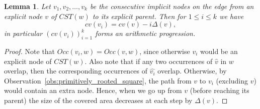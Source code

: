 \documentclass{article}
\theoremstyle{theorem}
\newtheorem{lemma}{Lemma}
\theoremstyle{definition}
\newcommand{\CST}{\mathit{CST}}
\newcommand{\Occ}{\mathit{Occ}}
\renewcommand{\c}{\mathit{cv}}
\begin{document}
  \begin{lemma}\label{lem:formula}
    Let $v_1,v_2,\ldots,v_k$ be the consecutive implicit nodes on the edge from an explicit node $v$ of $\CST(w)$
    to its explicit parent.
    Then for $1\le i \le k$ we have
    $$\c(v_i) = \c(v)-i\Delta(v),$$
    in particular $(\c(v_i))_{i=1}^k$ forms an arithmetic progression.
  \end{lemma}
  \begin{proof}
    Note that $\Occ(v_i,w) = \Occ(v,w)$, since otherwise $v_i$ would be an explicit node of $\CST(w)$.
    Also note that if any two occurrences of $\hat{v}$ in $w$ overlap, then the corresponding
    occurrences of $\hat{v_i}$ overlap.
    Otherwise, by Observation~\ref{obs:primitively_rooted_square},
    the path from $v$ to $v_i$ (excluding $v$) would contain an extra node.
    Hence, when we go up from $v$ (before reaching its parent) the size of the covered area
    decreases at each step by $\Delta(v)$.
  \end{proof}
\end{document}
